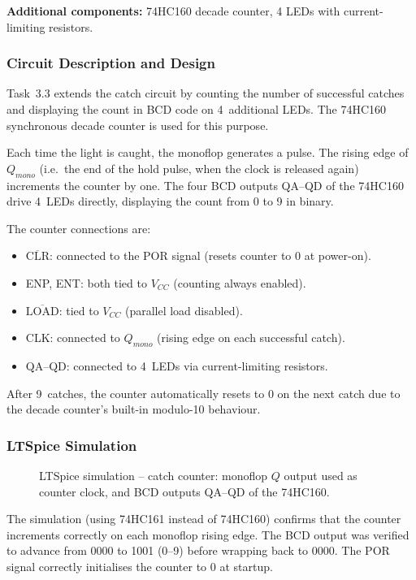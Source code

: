 \documentclass[12pt, a4paper]{article}
\begin{document}
\textbf{Additional components:} 74HC160 decade counter, 4 LEDs with
current-limiting resistors.

\subsubsection{Circuit Description and Design}

Task~3.3 extends the catch circuit by counting the number of successful catches and
displaying the count in BCD code on 4~additional LEDs.
The 74HC160 synchronous decade counter is used for this purpose.

Each time the light is caught, the monoflop generates a pulse.
The rising edge of $Q_{mono}$ (i.e.\ the end of the hold pulse, when the clock is
released again) increments the counter by one.
The four BCD outputs QA--QD of the 74HC160 drive 4~LEDs directly, displaying the
count from 0 to 9 in binary.

The counter connections are:
\begin{itemize}[leftmargin=1.5em]
  \item $\overline{\text{CLR}}$: connected to the POR signal (resets counter to 0
        at power-on).
  \item ENP, ENT: both tied to $V_{CC}$ (counting always enabled).
  \item $\overline{\text{LOAD}}$: tied to $V_{CC}$ (parallel load disabled).
  \item CLK: connected to $Q_{mono}$ (rising edge on each successful catch).
  \item QA--QD: connected to 4~LEDs via current-limiting resistors.
\end{itemize}

After 9~catches, the counter automatically resets to 0 on the next catch due to
the decade counter's built-in modulo-10 behaviour.

\subsubsection{LTSpice Simulation}

\begin{figure}[H]
  \centering
  \caption{LTSpice simulation -- catch counter: monoflop $Q$ output used as counter
           clock, and BCD outputs QA--QD of the 74HC160.}
  \label{fig:sim_counter}
\end{figure}

The simulation (using 74HC161 instead of 74HC160) confirms that the counter
increments correctly on each monoflop rising edge. The BCD output was verified
to advance from 0000 to 1001 (0--9) before wrapping back to 0000.
The POR signal correctly initialises the counter to 0 at startup.
\end{document}

